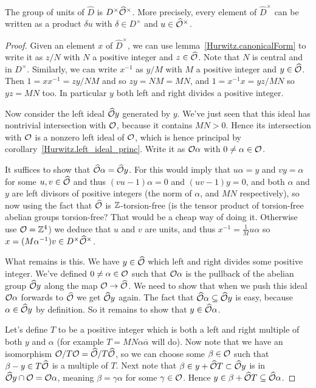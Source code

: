 \begin{theorem}
    \label{Hurwitz.completed_units}
    \leanok
    The group of units of $\widehat{D}$ is $D^\times\widehat{\mathcal{O}}^\times$.
    More precisely, every element of $\widehat{D}^\times$ can be written as a product $\delta u$
    with $\delta\in D^\times$ and $u\in\widehat{\mathcal{O}}^\times$.
\end{theorem}
\begin{proof}
    Given an element $x$ of $\widehat{D}^\times$, we can use lemma~\ref{Hurwitz.canonicalForm}
    to write it as $z/N$ with $N$ a positive integer
    and $z\in\widehat{\mathcal{O}}$. Note that $N$ is central and in $D^\times$. Similarly, we can
    write $x^{-1}$ as $y/M$ with $M$ a positive integer and $y\in\widehat{\mathcal{O}}$. Then
    $1=xx^{-1}=zy/NM$ and so $zy=NM=MN$, and $1=x^{-1}x=yz/MN$ so $yz=MN$ too. In particular $y$
    both left and right divides a positive integer.

    Now consider the left ideal $\widehat{\mathcal{O}}y$ generated by $y$. We've just seen that
    this ideal has nontrivial intersection with $\mathcal{O}$, because it contains $MN>0$. Hence
    its intersection with $\mathcal{O}$ is a nonzero left ideal of $\mathcal{O}$, which is
    hence principal by corollary~\ref{Hurwitz.left_ideal_princ}. Write it as $\mathcal{O}\alpha$
    with $0\not=\alpha\in\mathcal{O}$.

    It suffices to show that $\widehat{\mathcal{O}}\alpha=\widehat{\mathcal{O}} y$. For this would imply that
    $u\alpha=y$ and $vy=\alpha$ for some $u,v\in\widehat{\mathcal{O}}$ and thus $(vu-1)\alpha=0$
    and $(uv-1)y=0$, and both $\alpha$ and $y$ are left divisors of positive integers
    (the norm of $\alpha$, and $MN$ respectively), so now using the fact that $\widehat{\mathcal{O}}$
    is $\mathbb{Z}$-torsion-free (is the tensor product of torsion-free abelian groups torsion-free? That
    would be a cheap way of doing it. Otherwise use $\mathcal{O}=\mathbb{Z}^4$) we deduce that $u$ and $v$
    are units, and thus $x^{-1}=\frac{1}{M}u\alpha$ so $x=(M\alpha^{-1})v\in D^\times\widehat{\mathcal{O}}^\times$.

    What remains is this. We have $y\in\widehat{\mathcal{O}}$ which left and right divides some positive integer.
    We've defined $0\not=\alpha\in\mathcal{O}$ such that $\mathcal{O}\alpha$ is the pullback of the
    abelian group $\widehat{\mathcal{O}} y$ along the map $\mathcal{O}\to\widehat{\mathcal{O}}$. We need to show that when we push
    this ideal $\mathcal{O}\alpha$ forwards to $\widehat{\mathcal{O}}$ we get $\widehat{\mathcal{O}} y$ again. The fact that
    $\widehat{\mathcal{O}}\alpha\subseteq\widehat{\mathcal{O}} y$ is easy, because $\alpha\in\widehat{\mathcal{O}} y$ by definition.
    So it remains to show that $y\in\widehat{\mathcal{O}}\alpha$.

    Let's define $T$ to be a positive integer which is both a left and right multiple of
    both $y$ and $\alpha$ (for example $T=MN\alpha\overline{\alpha}$ will do). Now note that we
    have an isomorphism $\mathcal{O}/T\mathcal{O}=\widehat{\mathcal{O}}/T\widehat{\mathcal{O}}$, so we can choose
    some $\beta\in\mathcal{O}$ such that $\beta-y\in T\widehat{\mathcal{O}}$ is a multiple of $T$. Next note that
    $\beta\in y+\widehat{\mathcal{O}} T\subset \widehat{\mathcal{O}} y$ is in $\widehat{\mathcal{O}} y\cap\mathcal{O}=\mathcal{O}\alpha$, meaning
    $\beta=\gamma\alpha$ for some $\gamma\in\mathcal{O}$.
    Hence $y\in\beta+\widehat{\mathcal{O}} T\subseteq\widehat{\mathcal{O}}\alpha$.
\end{proof}
